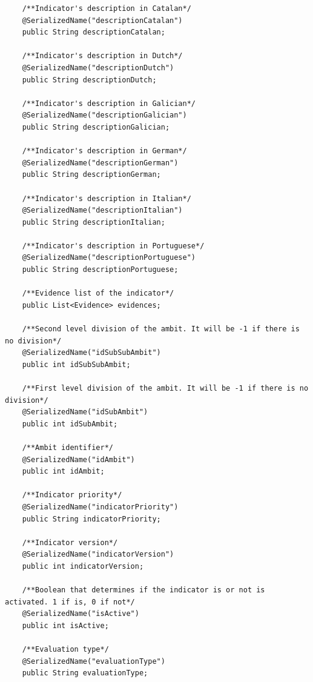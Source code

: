 \begin{itemize}
\begin{itemize}
\begin{lstlisting}
    /**Indicator's description in Catalan*/
    @SerializedName("descriptionCatalan")
    public String descriptionCatalan;

    /**Indicator's description in Dutch*/
    @SerializedName("descriptionDutch")
    public String descriptionDutch;

    /**Indicator's description in Galician*/
    @SerializedName("descriptionGalician")
    public String descriptionGalician;

    /**Indicator's description in German*/
    @SerializedName("descriptionGerman")
    public String descriptionGerman;

    /**Indicator's description in Italian*/
    @SerializedName("descriptionItalian")
    public String descriptionItalian;

    /**Indicator's description in Portuguese*/
    @SerializedName("descriptionPortuguese")
    public String descriptionPortuguese;

    /**Evidence list of the indicator*/
    public List<Evidence> evidences;

    /**Second level division of the ambit. It will be -1 if there is no division*/
    @SerializedName("idSubSubAmbit")
    public int idSubSubAmbit;

    /**First level division of the ambit. It will be -1 if there is no division*/
    @SerializedName("idSubAmbit")
    public int idSubAmbit;

    /**Ambit identifier*/
    @SerializedName("idAmbit")
    public int idAmbit;

    /**Indicator priority*/
    @SerializedName("indicatorPriority")
    public String indicatorPriority;

    /**Indicator version*/
    @SerializedName("indicatorVersion")
    public int indicatorVersion;

    /**Boolean that determines if the indicator is or not is activated. 1 if is, 0 if not*/
    @SerializedName("isActive")
    public int isActive;

    /**Evaluation type*/
    @SerializedName("evaluationType")
    public String evaluationType;




\end{lstlisting}
\end{itemize}
\end{itemize}
